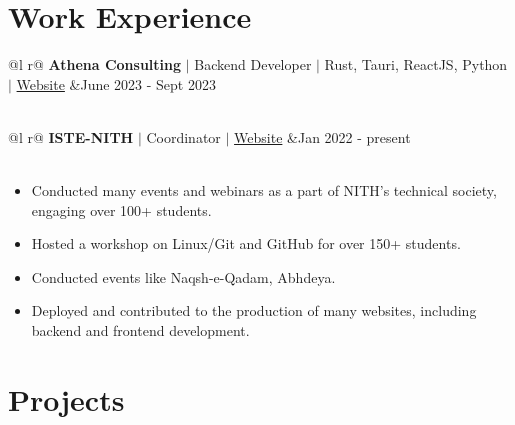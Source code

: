 \documentclass[legalpaper,11pt]{article}
\begin{document}
\section{Work Experience}

\begin{tabularx}{\linewidth}{ @{}l r@{} }
\textbf {Athena Consulting} $|$ Backend Developer $|$ Rust, Tauri, ReactJS, Python $|$ \href{https://www.athenaconsulting.io/}{Website} &\hfill June 2023 - Sept 2023 \\[3.75pt]
  \\
\end{tabularx}


\begin{tabularx}{\linewidth}{ @{}l r@{} }
\textbf{ISTE-NITH} $|$ Coordinator $|$ \href{https://www.istenith.com/}{Website} &\hfill Jan 2022 - present \\[3.75pt]
 \\
\end{tabularx}

\begin{itemize}[leftmargin=*,noitemsep,topsep=0pt]
    \item Conducted many events and webinars as a part of NITH's technical society, engaging over 100+ students.
    \item Hosted a workshop on Linux/Git and GitHub for over 150+ students.
    \item Conducted events like Naqsh-e-Qadam, Abhdeya.
    \item Deployed and contributed to the production of many websites, including backend and frontend development.
\end{itemize}


\section{Projects}
\end{document}
